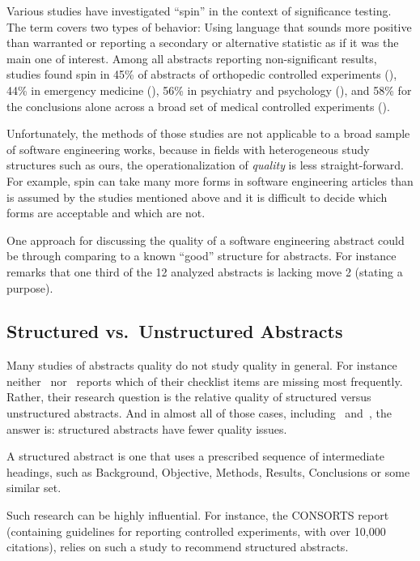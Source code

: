 \documentclass[10pt,journal,compsoc]{IEEEtran}
\begin{document}
Various studies have investigated ``spin'' in the context of significance testing.
The term covers two types of behavior: 
Using language that sounds more positive than warranted or
reporting a secondary or alternative statistic as if it was the main one of interest.
Among all abstracts reporting non-significant results, studies found spin in 
  45\% of abstracts of orthopedic controlled experiments (\cite{ArtZaaChe20}),
  44\% in emergency medicine (\cite{ReyRidBro20}),
  56\% in psychiatry and psychology (\cite{JelRobBow20}),
  and 58\% for the conclusions alone across a broad set of 
    medical controlled experiments (\cite{BouDutRav10}).

Unfortunately, the methods of those studies are not applicable to a 
broad sample of software engineering works, because
in fields with heterogeneous study structures such as ours, the operationalization of
\emph{quality} is less straight-forward.
For example, spin can take many more forms in software engineering articles
than is assumed by the studies mentioned above and it is difficult
to decide which forms are acceptable and which are not.

One approach for discussing the quality of a software engineering abstract 
could be through comparing to a known ``good'' structure for abstracts.
For instance~\cite{CroOpp06} remarks
that one third of the 12 analyzed abstracts is lacking move 2 (stating a purpose).


\subsection{Structured vs.\ Unstructured Abstracts}\label{relatedworkstructured}

Many studies of abstracts quality do not study quality in general.
For instance neither~\cite{DupKhoLeb03} nor~\cite{ShaHar06} reports
which of their checklist items are missing most frequently.
Rather, their research question is the relative quality of structured
versus unstructured abstracts.
And in almost all of those cases, including~\cite{DupKhoLeb03} and~\cite{ShaHar06},
the answer is: structured abstracts have fewer quality issues.

A structured abstract is one that uses a prescribed sequence of 
intermediate headings, such as Background, Objective, Methods, Results,
Conclusions or some similar set.

Such research can be highly influential.
For instance, the CONSORTS report~\cite{MohHopSch12}
(containing guidelines for reporting controlled experiments, with over 10,000 citations),
relies on such a study \cite{HarSydBlu96} to recommend structured abstracts.
\end{document}
